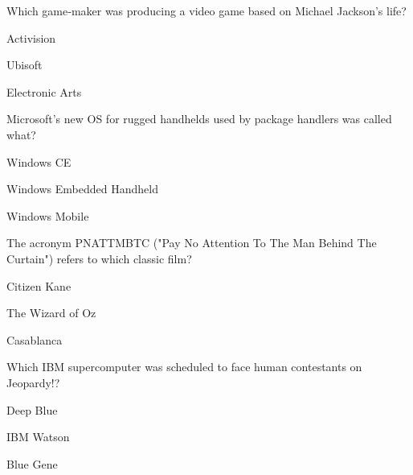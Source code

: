 \begin{enhancedmcq}{Which game‑maker was producing a video game based on Michael Jackson's life?}
\item Activision
\item Ubisoft
\item Electronic Arts

\end{enhancedmcq}
\begin{enhancedmcq}{Microsoft's new OS for rugged handhelds used by package handlers was called what?}
\item Windows CE
\item Windows Embedded Handheld
\item Windows Mobile

\end{enhancedmcq}
\begin{enhancedmcq}{The acronym PNATTMBTC ("Pay No Attention To The Man Behind The Curtain") refers to which classic film?}
\item Citizen Kane
\item The Wizard of Oz
\item Casablanca

\end{enhancedmcq}
\begin{enhancedmcq}{Which IBM supercomputer was scheduled to face human contestants on Jeopardy!?}
\item Deep Blue
\item IBM Watson
\item Blue Gene

 
\end{enhancedmcq}